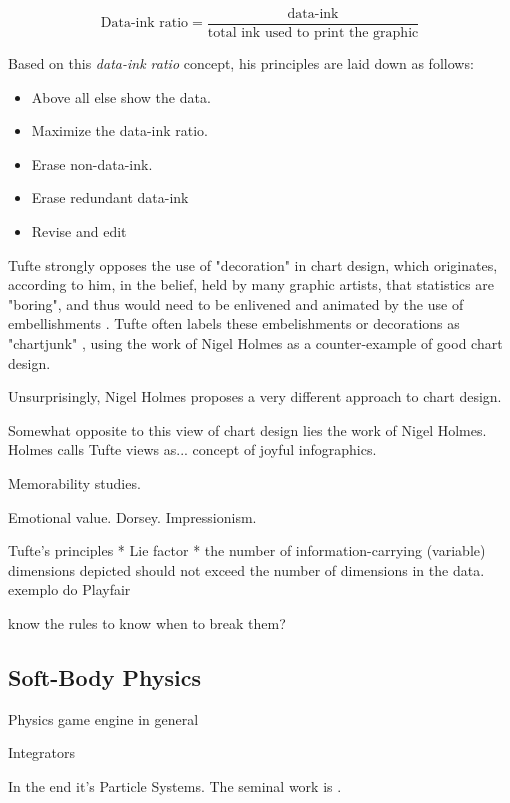 \documentclass[manuscript, screen]{timtm}
\begin{document}
\begin{displaymath} 
    \text{Data-ink ratio} = \frac{\text{data-ink}}{\text{total ink used to print the graphic}}
\end{displaymath}

Based on this \textit{data-ink ratio} concept, his principles are laid down as follows:

\begin{itemize}
    \item Above all else show the data.
    \item Maximize the data-ink ratio.
    \item Erase non-data-ink.
    \item Erase redundant data-ink
    \item Revise and edit
\end{itemize}

Tufte strongly opposes the use of "decoration" in chart design, which originates, according to him, in the belief, held by many graphic artists, that statistics are "boring", and thus would need to be enlivened and animated by the use of embellishments \cite{tufte2001visual, tufte1990envisioning}. Tufte often labels these embelishments or decorations as "chartjunk" \cite{tufte2001visual}, using the work of Nigel Holmes as a counter-example of good chart design.

Unsurprisingly, Nigel Holmes proposes a very different approach to chart design.

Somewhat opposite to this view of chart design lies the work of Nigel Holmes. Holmes calls Tufte views as... concept of joyful infographics.

Memorability studies.

Emotional value. Dorsey. Impressionism.

Tufte's principles
* Lie factor
* the number of information-carrying (variable) dimensions depicted should not exceed the number of dimensions in the data.
exemplo do Playfair

know the rules to know when to break them?


\subsection{Soft-Body Physics} \label{background-soft-body}

Physics game engine in general

Integrators

In the end it's Particle Systems. The seminal work is \cite{particle-ReevesW.T.1983PSTf}.
\end{document}
